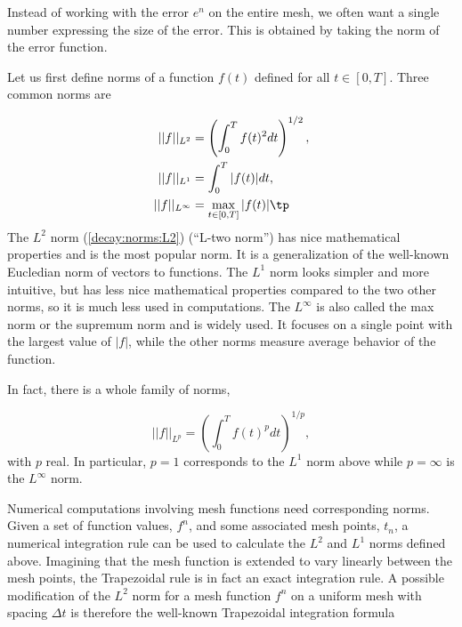 \documentclass[graybox,sectrefs,envcountresetchap,open=right,final]{svmonodo}
\begin{document}

Instead of working with the error $e^n$ on the entire mesh, we
often want a single number expressing the size of the error.
This is obtained by taking the norm of the error function.

Let us first define norms of a function $f(t)$
defined for all $t\in [0,T]$.
Three common norms are

\begin{align}
||f||_{L^2} &= \left( \int_0^T f(t)^2 dt\right)^{1/2},
\label{decay:norms:L2}\\ 
||f||_{L^1} &= \int_0^T |f(t)| dt,
\label{decay:norms:L1}\\ 
||f||_{L^\infty} &= \max_{t\in [0,T]}|f(t)|\tp
\label{decay:norms:Linf}
\end{align}
The $L^2$ norm (\ref{decay:norms:L2}) (``L-two norm'')
has nice mathematical properties and
is the most popular norm. It is a generalization
of the well-known Eucledian norm of vectors to functions.
The $L^1$ norm looks simpler and more intuitive, but has less
nice mathematical properties compared to the two other norms, so
it is much less used in computations.
The $L^\infty$ is also called the max norm or the supremum norm
and is widely used. It focuses on a single point with the largest
value of $|f|$, while the other norms measure average behavior of
the function.

In fact, there is a whole family of norms,

\begin{equation}
||f||_{L^p} = \left(\int_0^T f(t)^pdt\right)^{1/p},
\end{equation}
with $p$ real. In particular,
$p=1$ corresponds to the $L^1$ norm above while $p=\infty$ is the
$L^\infty$ norm.


Numerical computations involving mesh functions need corresponding norms.
Given a set of function values, $f^n$, and some associated mesh points, $t_n$,
a numerical integration rule can be used to calculate the $L^2$ and
$L^1$ norms defined above. Imagining that the mesh function is extended
to vary linearly between the mesh points, the Trapezoidal rule is
in fact an exact integration rule. A possible modification of the $L^2$
norm for a mesh function $f^n$ on a uniform mesh with spacing $\Delta t$
is therefore the well-known Trapezoidal integration formula
\end{document}
